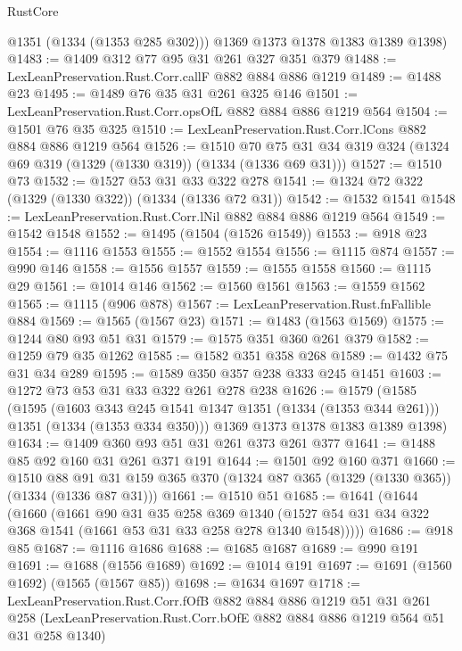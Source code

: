 \begin{lexlean}{RustCore}
\begin{coremodule}
        @1351
        (@1334 (@1353 @285 @302)))
      @1369
      @1373
      @1378
      @1383
      @1389
      @1398)
@1483 := @1409 @312 @77 @95 @31 @261 @327 @351 @379
@1488 := LexLeanPreservation.Rust.Corr.callF @882 @884 @886 @1219
@1489 := @1488 @23
@1495 := @1489 @76 @35 @31 @261 @325 @146
@1501 := LexLeanPreservation.Rust.Corr.opsOfL @882 @884 @886 @1219 @564
@1504 := @1501 @76 @35 @325
@1510 := LexLeanPreservation.Rust.Corr.lCons @882 @884 @886 @1219 @564
@1526 := @1510
    @70
    @75
    @31
    @34
    @319
    @324
    (@1324 @69 @319 (@1329 (@1330 @319)) (@1334 (@1336 @69 @31)))
@1527 := @1510 @73
@1532 := @1527 @53 @31 @33 @322 @278
@1541 := @1324 @72 @322 (@1329 (@1330 @322)) (@1334 (@1336 @72 @31))
@1542 := @1532 @1541
@1548 := LexLeanPreservation.Rust.Corr.lNil @882 @884 @886 @1219 @564
@1549 := @1542 @1548
@1552 := @1495 (@1504 (@1526 @1549))
@1553 := @918 @23
@1554 := @1116 @1553
@1555 := @1552 @1554
@1556 := @1115 @874
@1557 := @990 @146
@1558 := @1556 @1557
@1559 := @1555 @1558
@1560 := @1115 @29
@1561 := @1014 @146
@1562 := @1560 @1561
@1563 := @1559 @1562
@1565 := @1115 (@906 @878)
@1567 := LexLeanPreservation.Rust.fnFallible @884
@1569 := @1565 (@1567 @23)
@1571 := @1483 (@1563 @1569)
@1575 := @1244 @80 @93 @51 @31
@1579 := @1575 @351 @360 @261 @379
@1582 := @1259 @79 @35 @1262
@1585 := @1582 @351 @358 @268
@1589 := @1432 @75 @31 @34 @289
@1595 := @1589 @350 @357 @238 @333 @245 @1451
@1603 := @1272 @73 @53 @31 @33 @322 @261 @278 @238
@1626 := @1579
    (@1585
      (@1595
        (@1603 @343 @245 @1541 @1347 @1351 (@1334 (@1353 @344 @261)))
        @1351
        (@1334 (@1353 @334 @350)))
      @1369
      @1373
      @1378
      @1383
      @1389
      @1398)
@1634 := @1409 @360 @93 @51 @31 @261 @373 @261 @377
@1641 := @1488 @85 @92 @160 @31 @261 @371 @191
@1644 := @1501 @92 @160 @371
@1660 := @1510
    @88
    @91
    @31
    @159
    @365
    @370
    (@1324 @87 @365 (@1329 (@1330 @365)) (@1334 (@1336 @87 @31)))
@1661 := @1510 @51
@1685 := @1641
    (@1644
      (@1660
        (@1661
          @90
          @31
          @35
          @258
          @369
          @1340
          (@1527 @54 @31 @34 @322 @368 @1541 (@1661 @53 @31 @33 @258 @278 @1340 @1548)))))
@1686 := @918 @85
@1687 := @1116 @1686
@1688 := @1685 @1687
@1689 := @990 @191
@1691 := @1688 (@1556 @1689)
@1692 := @1014 @191
@1697 := @1691 (@1560 @1692) (@1565 (@1567 @85))
@1698 := @1634 @1697
@1718 := LexLeanPreservation.Rust.Corr.fOfB
    @882
    @884
    @886
    @1219
    @51
    @31
    @261
    @258
    (LexLeanPreservation.Rust.Corr.bOfE @882 @884 @886 @1219 @564 @51 @31 @258 @1340)

\end{coremodule}
\end{lexlean}

